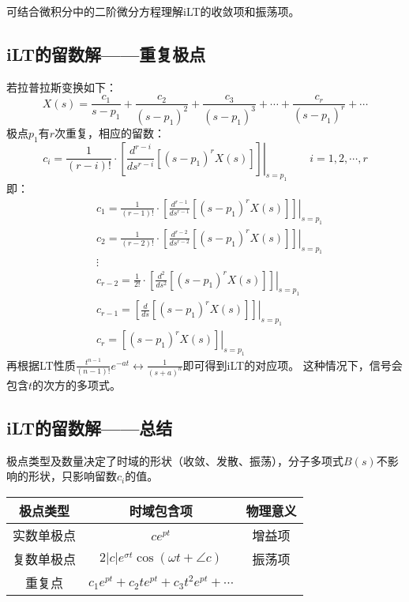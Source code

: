 \begin{tcolorbox}
可结合微积分中的二阶微分方程理解iLT的收敛项和振荡项。
\end{tcolorbox}

\subsection{iLT的留数解——重复极点}

若拉普拉斯变换如下：
\[
X\left( s \right) =\frac{c_1}{s-p_1}+\frac{c_2}{\left( s-p_1 \right) ^2}+\frac{c_3}{\left( s-p_1 \right) ^3}+\cdots +\frac{c_r}{\left( s-p_1 \right) ^r}+\cdots
\]
极点$p_1$有$r$次重复，相应的留数：
\[
c_i=\frac{1}{\left( r-i \right) !}\cdot \left. \left[ \frac{d^{r-i}}{ds^{r-i}}\left[ \left( s-p_1 \right) ^rX\left( s \right) \right] \right] \right|_{s=p_1} \qquad i=1,2,\cdots ,r
\]
即：
\begin{align*}
&c_1=\frac{1}{\left( r-1 \right) !}\cdot \left. \left[ \frac{d^{r-1}}{ds^{r-1}}\left[ \left( s-p_1 \right) ^rX\left( s \right) \right] \right] \right|_{s=p_1} \\
&c_2=\frac{1}{\left( r-2 \right) !}\cdot \left. \left[ \frac{d^{r-2}}{ds^{r-2}}\left[ \left( s-p_1 \right) ^rX\left( s \right) \right] \right] \right|_{s=p_1} \\
&\vdots \\
&c_{r-2}=\frac{1}{2!}\cdot \left. \left[ \frac{d^2}{ds^2}\left[ \left( s-p_1 \right) ^rX\left( s \right) \right] \right] \right|_{s=p_1} \\
&c_{r-1}=\left. \left[ \frac{d}{ds}\left[ \left( s-p_1 \right) ^rX\left( s \right) \right] \right] \right|_{s=p_1} \\
&c_r=\left. \left[ \left( s-p_1 \right) ^rX\left( s \right) \right] \right|_{s=p_1}
\end{align*}
再根据LT性质$\frac{t^{n-1}}{\left( n-1 \right) !}e^{-at}\leftrightarrow \frac{1}{\left( s+a \right) ^n}$即可得到iLT的对应项。
这种情况下，信号会包含$t$的次方的多项式。

\subsection{iLT的留数解——总结}

极点类型及数量决定了时域的形状（收敛、发散、振荡），分子多项式$B\left( s \right) $不影响的形状，只影响留数$c_i$的值。
\begin{table}[h]
\centering
\begin{tabular}{ccc}
    \toprule
    极点类型 & 时域包含项 & 物理意义\\
    \midrule
    实数单极点 & $ce^{pt}$ & 增益项\\
    复数单极点 & $2\left| c \right|e^{\sigma t}\cos \left( \omega t+\angle c \right) $ & 振荡项\\
    重复点 & $c_1e^{pt}+c_2te^{pt}+c_3t^2e^{pt}+\cdots $ & \\
    \bottomrule
\end{tabular}
\end{table}

